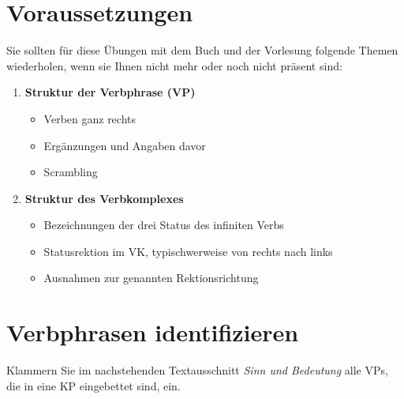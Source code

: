 \section*{Voraussetzungen}

Sie sollten für diese Übungen mit dem Buch und der Vorlesung folgende Themen wiederholen, wenn sie Ihnen nicht mehr oder noch nicht präsent sind:

\begin{enumerate}\Lf
  \item \textbf{Struktur der Verbphrase (VP)}
    \begin{itemize}\Lf
      \item Verben ganz rechts
      \item Ergänzungen und Angaben davor
      \item Scrambling
    \end{itemize}
  \item \textbf{Struktur des Verbkomplexes}
    \begin{itemize}\Lf
      \item Bezeichnungen der drei Status des infiniten Verbs
      \item Statusrektion im VK, typischwerweise von rechts nach links
      \item Ausnahmen zur genannten Rektionsrichtung
    \end{itemize}
\end{enumerate}

\section{Verbphrasen identifizieren}

Klammern Sie im nachstehenden Textausschnitt \textit{Sinn und Bedeutung} alle VPs, die in eine KP eingebettet sind, ein.

